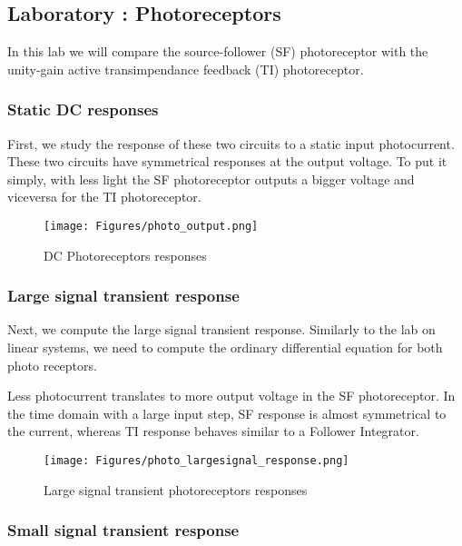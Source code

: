 \subsection{Laboratory : Photoreceptors }

In this lab we will compare the source-follower (SF) photoreceptor with the unity-gain active transimpendance feedback (TI) photoreceptor.

\subsubsection{Static DC responses}
First, we study the response of these two circuits to a static input photocurrent.
These two circuits have symmetrical responses                                at the output voltage. To put it simply, with less light the SF photoreceptor outputs a bigger voltage and viceversa for the TI photoreceptor. 

\begin{figure}[H]
    \centering
    \texttt{[image: Figures/photo\_output.png]}
    \caption{DC Photoreceptors responses}
    \label{fig:basalandcerebellum}
\end{figure}

\subsubsection{Large signal transient response}

Next, we compute the large signal transient response. Similarly to the lab on linear systems, we need to compute the ordinary differential equation for both photo receptors. 

Less photocurrent translates to more output voltage in the SF photoreceptor. In the time domain with a large input step, SF response is almost symmetrical to the current, whereas TI response behaves similar to a Follower Integrator.

\begin{figure}[H]
    \centering
    \texttt{[image: Figures/photo\_largesignal\_response.png]}
    \caption{Large signal transient photoreceptors responses}
    \label{fig:basalandcerebellum}
\end{figure}

\subsubsection{Small signal transient response}

